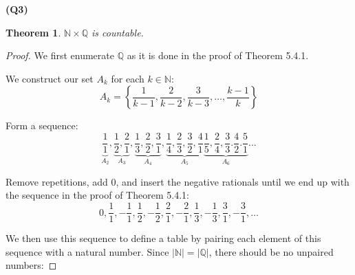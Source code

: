 \documentclass[12pt, a4paper]{article}
\newcommand{\Q}{\mathbb{Q}}
\newcommand{\N}{\mathbb{N}}
\newtheorem{theorem}{Theorem}
\begin{document}
\noindent\textbf{(Q3)}

\begin{theorem}
    $\N \times \Q$ is countable.
\end{theorem}

\begin{proof}
    We first enumerate $\Q$ as it is done in the proof of Theorem 5.4.1.

    We construct our set $A_k$ for each $k \in \N$:
    \[
        A_k = \left\{ \frac{1}{k - 1}, \frac{2}{k - 2}, \frac{3}{k - 3},
         \ldots ,\frac{k - 1}{k} \right\}
    \]

    Form a sequence:
    \[
        \underbrace{\frac{1}{1}}_{A_2},
        \underbrace{\frac{1}{2}, \frac{2}{1}}_{A_3},
        \underbrace{\frac{1}{3}, \frac{2}{2}, \frac{3}{1}}_{A_4},
        \underbrace{\frac{1}{4}, \frac{2}{3}, \frac{3}{2}, \frac{4}{1}}_{A_5}
        \underbrace{\frac{1}{5}, \frac{2}{4}, \frac{3}{3}. \frac{4}{2}. \frac{5}{1}}_{A_6}
        \ldots
    \]

    Remove repetitions, add 0, and insert the negative rationals until we end up
    with the sequence in the proof of Theorem 5.4.1:
    \[
        0, \frac{1}{1}, -\frac{1}{1},
        \frac{1}{2}, -\frac{1}{2},
        \frac{2}{1}, -\frac{2}{1},
        \frac{1}{3}, -\frac{1}{3},
        \frac{3}{1}, -\frac{3}{1}, \ldots
    \]

    We then use this sequence to define a table by pairing each element of this
    sequence with a natural number. Since $|\N| = |\Q|$, there should be no
    unpaired numbers:
    
    







\end{proof}
\end{document}
